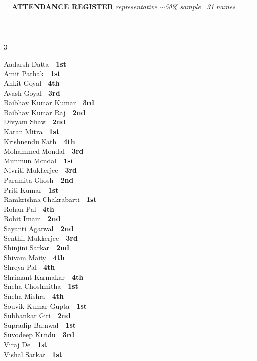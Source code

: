 \documentclass[11pt,a4paper]{article}
\begin{document}
\vspace{3pt}\noindent
{\footnotesize\bfseries\color{Slate}\faListOl~~ATTENDANCE REGISTER}%
\hfill{\scriptsize\itshape\color{Slate}representative $\sim$50\% sample \textperiodcentered\ 31 names}\\[3pt]
{\color{Line}\rule{\linewidth}{0.5pt}}\\[5pt]
\begingroup\footnotesize\setlength{\columnsep}{20pt}\setlength{\parskip}{1pt}%
\begin{multicols}{3}\raggedright
Aadarsh Datta~\dotfill~\textbf{1st}\\
Amit Pathak~\dotfill~\textbf{1st}\\
Ankit Goyal~\dotfill~\textbf{4th}\\
Avash Goyal~\dotfill~\textbf{3rd}\\
Baibhav Kumar Kumar~\dotfill~\textbf{3rd}\\
Baibhav Kumar Raj~\dotfill~\textbf{2nd}\\
Divyam Shaw~\dotfill~\textbf{2nd}\\
Karan Mitra~\dotfill~\textbf{1st}\\
Krishnendu Nath~\dotfill~\textbf{4th}\\
Mohammed Mondal~\dotfill~\textbf{3rd}\\
Munmun Mondal~\dotfill~\textbf{1st}\\
Nivriti Mukherjee~\dotfill~\textbf{3rd}\\
Paramita Ghosh~\dotfill~\textbf{2nd}\\
Priti Kumar~\dotfill~\textbf{1st}\\
Ramkrishna Chakrabarti~\dotfill~\textbf{1st}\\
Rohan Pal~\dotfill~\textbf{4th}\\
Rohit Imam~\dotfill~\textbf{2nd}\\
Sayanti Agarwal~\dotfill~\textbf{2nd}\\
Senthil Mukherjee~\dotfill~\textbf{3rd}\\
Shinjini Sarkar~\dotfill~\textbf{2nd}\\
Shivam Maity~\dotfill~\textbf{4th}\\
Shreya Pal~\dotfill~\textbf{4th}\\
Shrimant Karmakar~\dotfill~\textbf{4th}\\
Sneha Choshmitha~\dotfill~\textbf{1st}\\
Sneha Mishra~\dotfill~\textbf{4th}\\
Souvik Kumar Gupta~\dotfill~\textbf{1st}\\
Subhankar Giri~\dotfill~\textbf{2nd}\\
Supradip Barnwal~\dotfill~\textbf{1st}\\
Suvodeep Kundu~\dotfill~\textbf{3rd}\\
Viraj De~\dotfill~\textbf{1st}\\
Vishal Sarkar~\dotfill~\textbf{1st}\\
\end{multicols}
\endgroup
\end{document}
